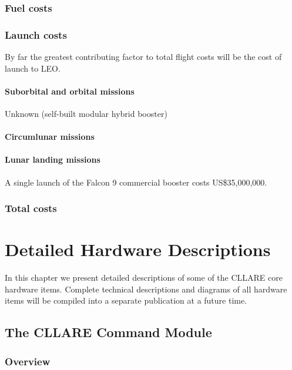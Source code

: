 \documentclass{report}
\begin{document}
\subsection{Fuel costs}

\subsection{Launch costs}

By far the greatest contributing factor to total flight costs will be the cost of launch to LEO. 
\subsubsection{Suborbital and orbital missions}

Unknown (self-built modular hybrid booster)

\subsubsection{Circumlunar missions}
\subsubsection{Lunar landing missions}

A single launch of the Falcon 9 commercial booster costs US\$35,000,000.

\subsection{Total costs}


\chapter{Detailed Hardware Descriptions} \label{chap:detailed}

In this chapter we present detailed descriptions of some of the CLLARE core hardware items.  Complete technical descriptions and diagrams of all hardware items will be compiled into a separate publication at a future time.

\section{The CLLARE Command Module}

\subsection{Overview}
\end{document}
